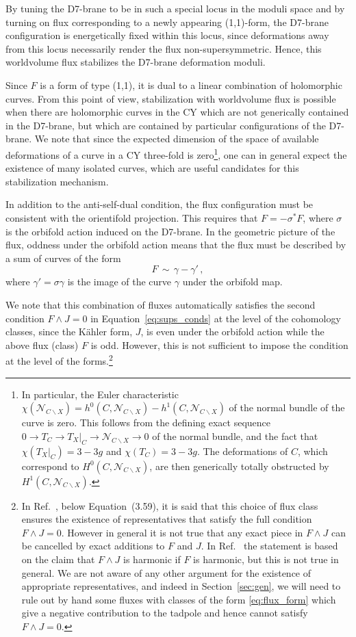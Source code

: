 \documentclass[a4paper,12pt]{article}
\numberwithin{equation}{section}
\newcommand{\kahl}{K\"ahler}
\newcommand{\mc}{\mathcal}
\newcommand{\be}{\begin{equation}}
\newcommand{\ee}{\end{equation}}
\newcommand{\ori}{\sigma}				%
\newcommand{\crv}{\gamma}			%
\newcommand{\tanb}[1]{T_{#1}}			%
\newcommand{\nrmb}[2]{\mc{N}_{{#1}\backslash{#2}}}%
\begin{document}
By tuning the D7-brane to be in such a special locus in the moduli space and by turning on flux corresponding to a newly appearing (1,1)-form, the D7-brane configuration is energetically fixed within this locus, since deformations away from this locus necessarily render the flux non-supersymmetric. Hence, this worldvolume flux stabilizes the D7-brane deformation moduli.

\bigskip

Since $F$ is a form of type (1,1), it is dual to a linear combination of holomorphic curves. From this point of view, stabilization with worldvolume flux is possible when there are holomorphic curves in the CY which are not generically contained in the D7-brane, but which are contained by particular configurations of the D7-brane. We note that since the expected dimension of the space of available deformations of a curve in a CY three-fold is zero\footnote{In particular, the Euler characteristic $\chi(\nrmb{C}{X}) = h^0(C,\nrmb{C}{X}) - h^1(C,\nrmb{C}{X})$ of the normal bundle of the curve is zero. This follows from the defining exact sequence $0 \to \tanb{C} \to \tanb{X}|_C \to \nrmb{C}{X} \to 0$ of the normal bundle, and the fact that $\chi(\tanb{X}|_C) = 3-3g$ and $\chi(\tanb{C}) = 3-3g$. The deformations of $C$, which correspond to $H^0(C,\nrmb{C}{X})$, are then generically totally obstructed by $H^1(C,\nrmb{C}{X})$.}, one can in general expect the existence of many isolated curves, which are useful candidates for this stabilization mechanism.

In addition to the anti-self-dual condition, the flux configuration must be consistent with the orientifold projection. This requires that $F = -\ori^*F$, where $\ori$ is the orbifold action induced on the D7-brane. In the geometric picture of the flux, oddness under the orbifold action means that the flux must be described by a sum of curves of the form
\be
F \, \sim \, \crv - \crv' \,,
\label{eq:flux_form}
\ee
where $\crv' = \ori \crv$ is the image of the curve $\crv$ under the orbifold map.

We note that this combination of fluxes automatically satisfies the second condition $F \wedge J = 0$ in Equation~\eqref{eq:sups_conds} at the level of the cohomology classes, since the {\kahl} form, $J$, is even under the orbifold action while the above flux (class) $F$ is odd. However, this is not sufficient to impose the condition at the level of the forms.\footnote{In Ref.~\cite{Collinucci:2008pf}, below Equation~(3.59), it is said that this choice of flux class ensures the existence of representatives that satisfy the full condition $F \wedge J = 0$. However in general it is not true that any exact piece in $F \wedge J$ can be cancelled by exact additions to $F$ and $J$. In Ref.~\cite{Collinucci:2008pf} the statement is based on the claim that $F \wedge J$ is harmonic if $F$ is harmonic, but this is not true in general. We are not aware of any other argument for the existence of appropriate representatives, and indeed in Section~\ref{sec:gen}, we will need to rule out by hand some fluxes with classes of the form \eqref{eq:flux_form} which give a negative contribution to the tadpole and hence cannot satisfy $F \wedge J = 0$.}
\end{document}
